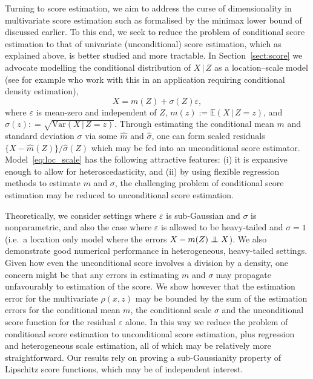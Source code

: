 \documentclass[aos]{imsart}
\newcommand{\E}{\mathbb{E}}
\newcommand{\Var}{\mathrm{Var}}
\newcommand{\given}{\,|\,}
\newcommand{\independent}{\mbox{${}\perp\mkern-11mu\perp{}$}}
\begin{document}
	Turning to score estimation, we aim to address the curse of dimensionality in multivariate score estimation such as formalised by the minimax lower bound of \citet{wibisono2024optimal} discussed earlier. To this end, we seek to reduce the problem of conditional score estimation to that of  univariate (unconditional) score estimation, which as explained above, is better studied and more tractable.
	In Section~\ref{sect:score} we advocate modelling the conditional distribution of $X\given  Z$ as a location--scale model (see for example \citet[Sec.~5]{kennedy2017non} who work with this in an application requiring conditional density estimation),
	\begin{equation} \label{eq:loc_scale}
		X=m(Z)+\sigma(Z)\varepsilon,
	\end{equation}
	where $\varepsilon$ is mean-zero and independent of $Z$, $m(z) := \E(X \given Z=z)$, and $\sigma(z): = \sqrt{\Var(X \given Z=z)}$. Through estimating the conditional mean $m$ and standard deviation $\sigma$ via some $\hat{m}$ and $\hat{\sigma}$, one can form scaled residuals $\{X-\hat{m}(Z)\} / \hat{\sigma}(Z)$ which may be fed into an unconditional score estimator. Model~\eqref{eq:loc_scale} has the following attractive features: (i) it is expansive enough to allow for heteroscedasticity, and (ii) by using flexible regression methods to estimate $m$ and $\sigma$, the challenging problem of conditional score estimation may be reduced to unconditional score estimation.
	
	Theoretically, we consider settings where $\varepsilon$ is sub-Gaussian and $\sigma$ is nonparametric, and also the case where $\varepsilon$ is allowed to be heavy-tailed and $\sigma=1$ (i.e.\ a location only model where the errors $X - m(Z) \independent X$). We also demonstrate good numerical performance in heterogeneous, heavy-tailed settings. Given how even the unconditional score involves a division by a density, one concern might be that any errors in estimating $m$ and $\sigma$ may propagate unfavourably to estimation of the score. We show however that the estimation error for the multivariate $\rho(x,z)$ may be bounded by the sum of the estimation errors for the conditional mean $m$, the conditional scale $\sigma$ and the unconditional score function for the residual $\varepsilon$ alone. In this way we reduce the problem of conditional score estimation to unconditional score estimation, plus regression and heterogeneous scale estimation, all of which may be relatively more straightforward.
	Our results rely on proving a sub-Gaussianity property of Lipschitz score functions, which may be of independent interest.
	
\end{document}
